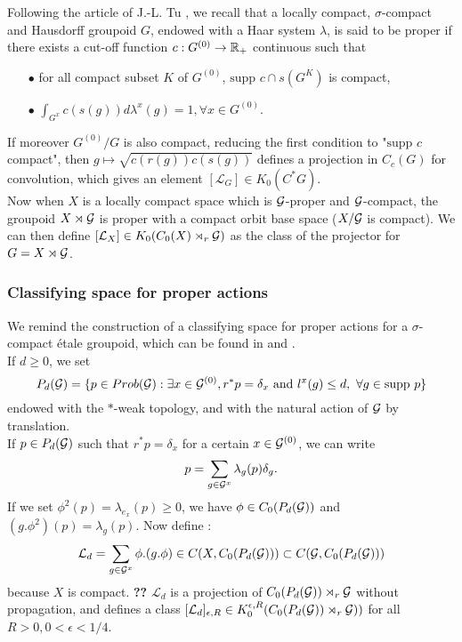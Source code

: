 Following the article of J.-L. Tu \cite{TuBC}, we recall that a locally compact, $\sigma$-compact and Hausdorff groupoid $G$, endowed with a Haar system $\lambda$, is said to be proper if there exists a cut-off function $c:G^{(0)}\rightarrow \mathbb R_+$ continuous such that 
\begin{itemize}
\item[$\bullet$] for all compact subset $K$ of $G^{(0)}$, $\text{supp }c\cap s(G^K)$ is compact,
\item[$\bullet$] $\int_{G^x}c(s(g))d\lambda^x(g)=1,\forall x \in G^{(0)}$.
\end{itemize}
If moreover $G^{(0)}/G$ is also compact, reducing the first condition to "$\text{supp }c$ compact", then $g\mapsto \sqrt{c(r(g))c(s(g))}$ defines a projection in $C_c(G)$ for convolution, which gives an element $[\mathcal L_G] \in K_0(C^*G)$.\\

Now when $X$ is a locally compact space which is $\mathcal G$-proper and $\mathcal G$-compact, the groupoid $X\rtimes\mathcal G$ is proper with a compact orbit base space ($X/\mathcal G$ is compact). We can then define $[\mathcal L_X]\in K_0(C_0(X)\rtimes_r \mathcal G)$ as the class of the projector for $G=X\rtimes\mathcal G$.

\subsubsection{Classifying space for proper actions}
We remind the construction of a classifying space for proper actions for a $\sigma$-compact étale groupoid, which can be found in \cite{TuBC2} and \cite{OY3}.\\
If $d\geq 0$, we set 
\[P_d(\mathcal G) = \{p\in Prob(\mathcal G) : \exists x\in \mathcal G^{(0)}, r^*p=\delta_x \text{ and } l^x(g)\leq d,\ \forall g \in \text{supp }p\}\]
endowed with the $*$-weak topology, and with the natural action of $\mathcal G$ by translation.\\
If $p\in P_d(\mathcal G)$ such that $r^*p = \delta_x$ for a certain $x\in \mathcal G^{(0)}$, we can write
\[p=\sum_{g\in \mathcal G^x} \lambda_g(p)\delta_g.\]
If we set $\phi^2(p)=\lambda_{e_x}(p)\geq 0$, we have $\phi \in C_0(P_d(\mathcal G))$ and $(g.\phi^2)(p)=\lambda_g(p)$. Now define :
\[\mathcal L_d = \sum_{g\in \mathcal G^x} \phi.(g.\phi)\in C(X,C_0(P_d(\mathcal G)))\subset C(\mathcal G,C_0(P_d(\mathcal G))) \]
because $X$ is compact. \textbf{??}
$\mathcal L_d$ is a projection of $C_0(P_d(\mathcal G))\rtimes_r \mathcal G$ without propagation, and defines a class $[\mathcal L_d]_{\epsilon,R}\in K_0^{\epsilon,R}(C_0(P_d(\mathcal G))\rtimes_r \mathcal G))$ for all $R>0,0<\epsilon<1/4$.\\

